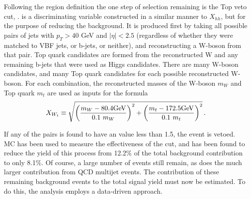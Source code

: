         Following the region definition the one step of selection remaining is the Top veto cut, \xwt.
        \xwt is a discriminating variable constructed in a similar manner to $X_{hh}$,
            but for the purpose of reducing the \ttbar background.
        It is produced first by taking all possible pairs of jets with $p_T > 40$ GeV and $|\eta| < 2.5$
            (regardless of whether they were matched to VBF jets, or b-jets, or neither),
            and reconstructing a W-boson from that pair.
        Top quark candidates are formed from the reconstructed W and any remaining b-jets that were used as Higgs candidates.
        There are many W-boson candidates, and many Top quark candidates for each possible reconstructed W-boson.
        For each combination, the reconstructed masses of the W-boson $m_W$ and Top quark $m_t$
            are used as inputs for the formula
        \begin{equation} \label{eq:xwt}
            \xwt \equiv \sqrt{\left(\frac{m_W - 80.4\textrm{GeV}}{0.1 \ m_W}\right)^{2}
                + \left(\frac{m_t - 172.5\textrm{GeV}}{0.1 \ m_t}\right)^{2}}
            \,.
        \end{equation}

        If any of the pairs is found to have an \xwt value less than 1.5, the event is vetoed. 
        \ttbar MC has been used to measure the effectiveness of the \xwt cut,
            and has been found to reduce the yield of this process from
            12.2\% of the total background contribution to only 8.1\%.
        Of course, a large number of \ttbar events still remain,
            as does the much larger contribution from QCD multijet events.
        The contribution of these remaining background events to the total signal yield
            must now be estimated.
        To do this, the analysis employs a data-driven approach.



